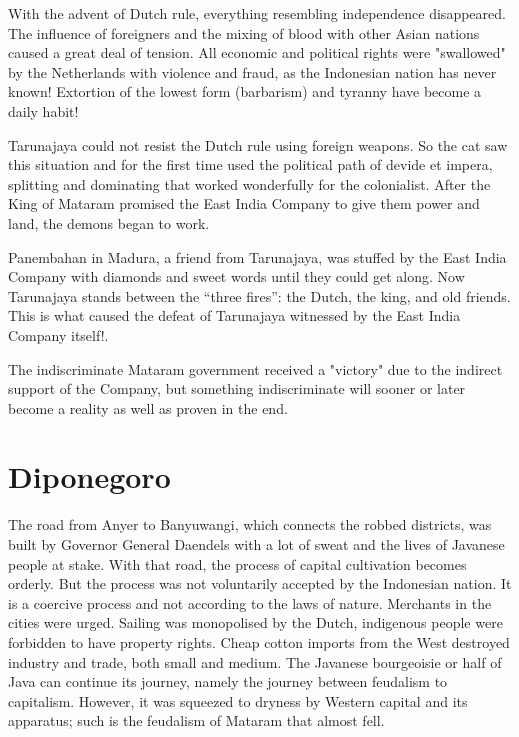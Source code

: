 With the advent of Dutch rule, everything resembling independence disappeared. The influence of 
foreigners and the mixing of blood with other Asian nations caused a great deal of tension. All 
economic and political rights were "swallowed" by the Netherlands with violence and fraud, as the 
Indonesian nation has never known! Extortion of the lowest form (barbarism) and tyranny have become a daily habit!\vskip 0.2in

Tarunajaya could not resist the Dutch rule using foreign weapons. So the cat saw this situation and 
for the first time used the political path of devide et impera, splitting and dominating that worked 
wonderfully for the colonialist. After the King of Mataram promised the East India Company to give 
them power and land, the demons began to work.\vskip 0.2in

Panembahan in Madura, a friend from Tarunajaya, was stuffed by the East India Company with diamonds 
and sweet words until they could get along. Now Tarunajaya stands between the “three fires”: the Dutch, 
the king, and old friends. This is what caused the defeat of Tarunajaya witnessed by the East India Company itself!.\vskip 0.2in

The indiscriminate Mataram government received a "victory" due to the indirect support of the Company, but 
something indiscriminate will sooner or later become a reality as well as proven in the end.\vskip 0.2in

\section{Diponegoro}

The road from Anyer to Banyuwangi, which connects the robbed districts, was built by Governor General 
Daendels with a lot of sweat and the lives of Javanese people at stake. With that road, 
the process of capital cultivation becomes orderly. But the process was not voluntarily accepted by 
the Indonesian nation. It is a coercive process and not according to the laws of nature. Merchants in 
the cities were urged. Sailing was monopolised by the Dutch, indigenous people were forbidden to 
have property rights. Cheap cotton imports from the West destroyed industry and trade, both 
small and medium. The Javanese bourgeoisie or half of Java can continue its journey, namely 
the journey between feudalism to capitalism. However, it was squeezed to dryness by Western 
capital and its apparatus; such is the feudalism of Mataram that almost fell.\vskip 0.2in

